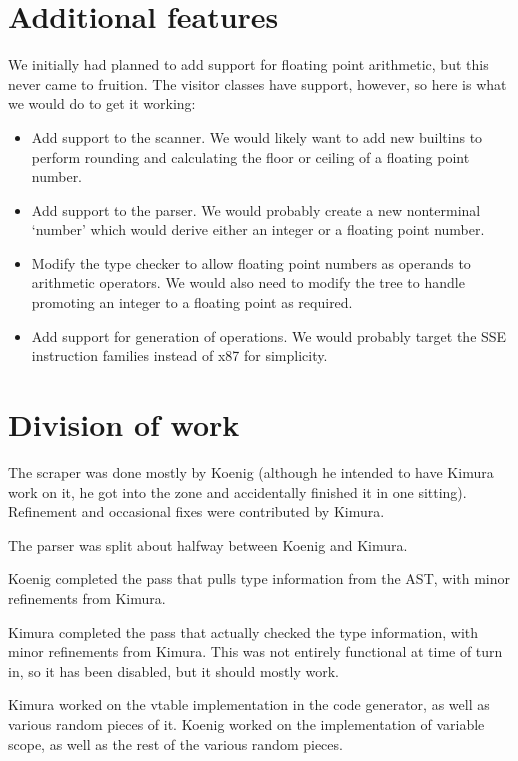\documentclass[letterpaper]{article}
\begin{document}
\section{Additional features}

We initially had planned to add support for floating point arithmetic, but
this never came to fruition. The visitor classes have support, however, so
here is what we would do to get it working:

\begin{itemize}

\item Add support to the scanner. We would likely want to add new builtins
to perform rounding and calculating the floor or ceiling of a floating point
number.

\item Add support to the parser. We would probably create a new nonterminal
`number' which would derive either an integer or a floating point number.

\item Modify the type checker to allow floating point numbers as operands to
arithmetic operators. We would also need to modify the tree to handle
promoting an integer to a floating point as required.

\item Add support for generation of operations. We would probably target the
SSE instruction families instead of x87 for simplicity.

\end{itemize}

\section{Division of work}

The scraper was done mostly by Koenig (although he intended to have Kimura
work on it, he got into the zone and accidentally finished it in one
sitting). Refinement and occasional fixes were contributed by Kimura.

The parser was split about halfway between Koenig and Kimura.

Koenig completed the pass that pulls type information from the AST, with
minor refinements from Kimura.

Kimura completed the pass that actually checked the type information, with
minor refinements from Kimura. This was not entirely functional at time of
turn in, so it has been disabled, but it should mostly work.

Kimura worked on the vtable implementation in the code generator, as well as
various random pieces of it. Koenig worked on the implementation of variable
scope, as well as the rest of the various random pieces.
\end{document}
